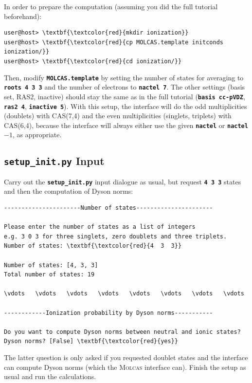 \documentclass[a4paper,11pt,DIV=15,openany]{scrbook}
\newcommand{\ttt}[1]{\textbf{\texttt{#1}}}
\begin{document}
In order to prepare the computation (assuming you did the full tutorial beforehand):
\begin{Verbatim}[commandchars=\\\{\}]
user@host> \textbf{\textcolor{red}{mkdir ionization}}
user@host> \textbf{\textcolor{red}{cp MOLCAS.template initconds ionization/}}
user@host> \textbf{\textcolor{red}{cd ionization/}}
\end{Verbatim}
Then, modify \ttt{MOLCAS.template} by setting the number of states for averaging to \ttt{roots 4 3 3} and the number of electrons to \ttt{nactel 7}. The other settings (basis set, RAS2, inactive) should stay the same as in the full tutorial (\ttt{basis cc-pVDZ}, \ttt{ras2 4}, \ttt{inactive 5}).
With this setup, the interface will do the odd multiplicities (doublets) with CAS(7,4) and the even multiplicities (singlets, triplets) with CAS(6,4), because the interface will always either use the given \ttt{nactel} or \ttt{nactel}$-1$, as appropriate.

\subsection{\ttt{setup\_init.py} Input}

Carry out the \ttt{setup\_init.py} input dialogue as usual, but request \ttt{4 3 3} states and then the computation of Dyson norms:
\begin{oframed}
\footnotesize\begin{Verbatim}[commandchars=\\\{\}]
----------------------Number of states----------------------

Please enter the number of states as a list of integers
e.g. 3 0 3 for three singlets, zero doublets and three triplets.
Number of states: \textbf{\textcolor{red}{4  3  3}}

Number of states: [4, 3, 3]
Total number of states: 19

\vdots   \vdots   \vdots   \vdots   \vdots   \vdots   \vdots   \vdots   

------------Ionization probability by Dyson norms-----------

Do you want to compute Dyson norms between neutral and ionic states?
Dyson norms? [False] \textbf{\textcolor{red}{yes}}
\end{Verbatim}
\end{oframed}

\normalsize
The latter question is only asked if you requested doublet states and the interface can compute Dyson norms (which the \textsc{Molcas} interface can).
Finish the setup as usual and run the calculations.
\end{document}
